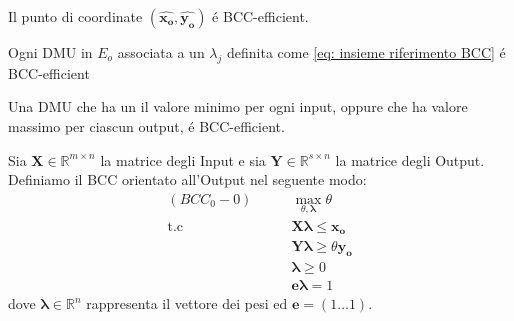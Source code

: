 \begin{teor}
Il punto di coordinate $(\boldsymbol{\hat{x_{o}}, \hat{y_{o}}})$ \'e BCC-efficient.
\end{teor}
\begin{teor}
Ogni DMU in $E_{o}$ associata a un $\lambda_{j}$ definita come \ref{eq: insieme riferimento BCC} \'e BCC-efficient
\end{teor}
\begin{teor}
Una DMU che ha un il valore minimo per ogni input, oppure che ha valore massimo per ciascun output, \'e BCC-efficient. 
\end{teor}
\begin{definiz}
Sia $\boldsymbol{X} \in \mathbb{R}^{m \times n}$ la matrice degli Input e sia $\boldsymbol{Y} \in \mathbb{R}^{s \times n}$  la matrice degli Output. Definiamo il BCC orientato all'Output nel seguente modo:
\begin{equation}
\begin{split}
(BCC_0-0) \qquad & \max_{\theta, \boldsymbol{\lambda}} \theta \\
\text{t.c} \qquad & \boldsymbol{X\lambda} \leq \boldsymbol{x_o} \\
& \boldsymbol{Y\lambda} \geq \theta\boldsymbol{y_o} \\
& \boldsymbol{\lambda} \geq 0 \\
& \boldsymbol{e\lambda} = 1
\end{split}
\end{equation}
dove $\boldsymbol{\lambda} \in \mathbb{R}^{n}$ rappresenta il vettore dei pesi ed $\boldsymbol{e} = (1 \dots 1)$.
\end{definiz}

